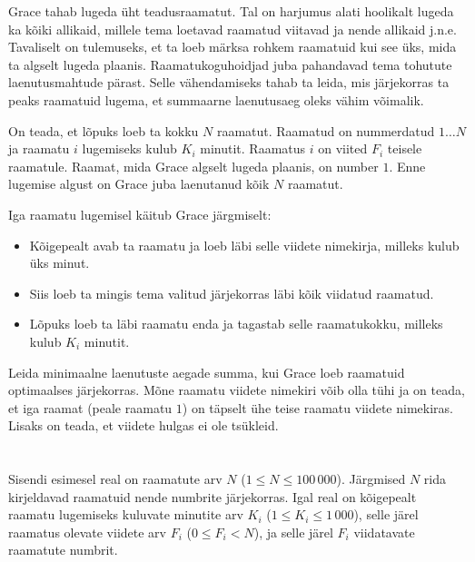 \ifx\boi\undefined\fi
\def\version{jury-1}

Grace tahab lugeda üht teadusraamatut.
Tal on harjumus alati hoolikalt lugeda ka kõiki allikaid, millele tema loetavad raamatud viitavad ja nende allikaid j.n.e.
Tavaliselt on tulemuseks, et ta loeb märksa rohkem raamatuid kui see üks, mida ta algselt lugeda plaanis.
Raamatukoguhoidjad juba pahandavad tema tohutute laenutusmahtude pärast.
Selle vähendamiseks tahab ta leida, mis järjekorras ta peaks raamatuid lugema, et summaarne laenutusaeg oleks vähim võimalik.

On teada, et lõpuks loeb ta kokku $N$ raamatut.
Raamatud on nummerdatud $1 \dots N$ ja raamatu $i$ lugemiseks kulub $K_i$ minutit.
Raamatus $i$ on viited $F_i$ teisele raamatule.
Raamat, mida Grace algselt lugeda plaanis, on number $1$.
Enne lugemise algust on Grace juba laenutanud kõik $N$ raamatut.

Iga raamatu lugemisel käitub Grace järgmiselt:
\begin{itemize}
\item Kõigepealt avab ta raamatu ja loeb läbi selle viidete nimekirja, milleks kulub üks minut.
\item Siis loeb ta mingis tema valitud järjekorras läbi kõik viidatud raamatud.
\item Lõpuks loeb ta läbi raamatu enda ja tagastab selle raamatukokku, milleks kulub $K_i$ minutit.
\end{itemize}

Leida minimaalne laenutuste aegade summa, kui Grace loeb raamatuid optimaalses järjekorras.
Mõne raamatu viidete nimekiri võib olla tühi ja on teada, et iga raamat (peale raamatu $1$) on täpselt ühe teise raamatu viidete nimekiras.
Lisaks on teada, et viidete hulgas ei ole tsükleid.

\section*{}
Sisendi esimesel real on raamatute arv $N$ ($1 \le N \le 100\,000$).
Järgmised $N$ rida kirjeldavad raamatuid nende numbrite järjekorras.
Igal real on kõigepealt raamatu lugemiseks kuluvate minutite arv $K_i$ ($1 \le K_i \le 1\,000$),
selle järel raamatus olevate viidete arv $F_i$ ($0 \le F_i < N$),
ja selle järel $F_i$ viidatavate raamatute numbrit.

